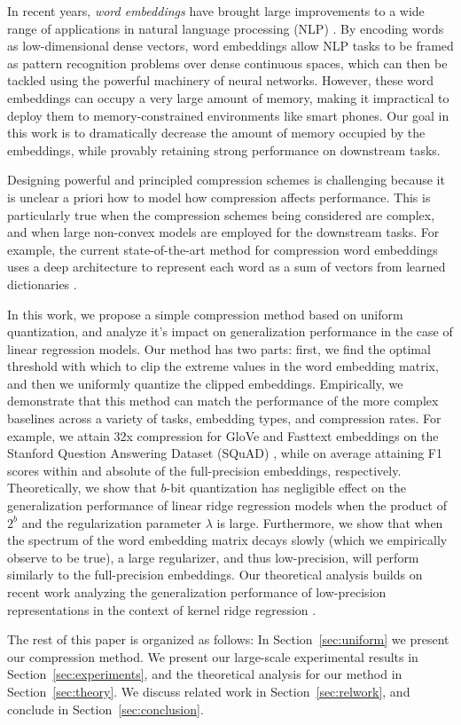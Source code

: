 In recent years, \textit{word embeddings} \citep{glove,word2vec} have brought large improvements to a wide range of applications in natural language processing (NLP) \citep{examples}.
By encoding words as low-dimensional dense vectors, word embeddings allow NLP tasks to be framed as pattern recognition problems over dense continuous spaces, which can then be tackled using the powerful machinery of neural networks.
However, these word embeddings can occupy a very large amount of memory, making it impractical to deploy them to memory-constrained environments like smart phones.
Our goal in this work is to dramatically decrease the amount of memory occupied by the embeddings, while provably retaining strong performance on downstream tasks.

Designing powerful and principled compression schemes is challenging because it is unclear a priori how to model how compression affects performance.
This is particularly true when the compression schemes being considered are complex, and when large non-convex models are employed for the downstream tasks.
For example, the current state-of-the-art method for compression word embeddings uses a deep architecture to represent each word as a sum of vectors from learned dictionaries \citep{dccl}.

In this work, we propose a simple compression method based on uniform quantization, and analyze it's impact on generalization performance in the case of linear regression models.
Our method has two parts: first, we find the optimal threshold with which to clip the extreme values in the word embedding matrix, and then we uniformly quantize the clipped embeddings.
Empirically, we demonstrate that this method can match the performance of the more complex baselines across a variety of tasks, embedding types, and compression rates.
For example, we attain 32x compression for GloVe and Fasttext embeddings on the Stanford Question Answering Dataset (SQuAD) \citep{x}, while on average attaining F1 scores within  and  absolute of the full-precision embeddings, respectively.
Theoretically, we show that $b$-bit quantization has negligible effect on the generalization performance of linear ridge regression models when the product of $2^b$ and the regularization parameter $\lambda$ is large.
Furthermore, we show that when the spectrum of the word embedding matrix decays slowly (which we empirically observe to be true), a large regularizer, and thus low-precision, will perform similarly to the full-precision embeddings.
Our theoretical analysis builds on recent work analyzing the generalization performance of low-precision representations in the context of kernel ridge regression \citep{our_work}.

The rest of this paper is organized as follows: In Section~\ref{sec:uniform} we present our compression method. We present our large-scale experimental results in Section~\ref{sec:experiments}, and the theoretical analysis for our method in Section~\ref{sec:theory}. We discuss related work in Section~\ref{sec:relwork}, and conclude in Section~\ref{sec:conclusion}.
